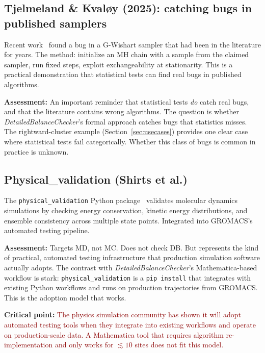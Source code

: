 \documentclass[11pt,a4paper]{article}
\newcommand{\bad}[1]{\textcolor{darkred}{#1}}
\newcommand{\DBC}{\textit{DetailedBalanceChecker}}
\begin{document}
\subsection{Tjelmeland \& Kvaløy (2025): catching bugs in published samplers}

Recent work~\cite{TjelmelandKvaloy2025} found a bug in a G-Wishart sampler that
had been in the literature for years.  The method: initialize an MH chain with
a sample from the claimed sampler, run fixed steps, exploit exchangeability at
stationarity.  This is a practical demonstration that statistical tests can find
real bugs in published algorithms.

\textbf{Assessment:}  An important reminder that statistical tests \emph{do} catch
real bugs, and that the literature contains wrong algorithms.  The question is
whether \DBC{}'s formal approach catches bugs that statistics misses.
The rightward-cluster example (Section~\ref{sec:usecases}) provides one clear
case where statistical tests fail categorically.  Whether this class of bugs is
common in practice is unknown.

\subsection{Physical\_validation (Shirts et al.)}

The \texttt{physical\_validation} Python package~\cite{PhysicalValidation2018}
validates molecular dynamics simulations by checking energy conservation, kinetic
energy distributions, and ensemble consistency across multiple state points.
Integrated into GROMACS's automated testing pipeline.

\textbf{Assessment:}  Targets MD, not MC.  Does not check DB.  But represents the
kind of practical, automated testing infrastructure that production simulation
software actually adopts.  The contrast with \DBC{}'s Mathematica-based workflow
is stark: \texttt{physical\_validation} is a \texttt{pip install} that integrates
with existing Python workflows and runs on production trajectories from GROMACS.
This is the adoption model that works.

\textbf{Critical point:}  \bad{The physics simulation community has shown it will
adopt automated testing tools when they integrate into existing workflows and
operate on production-scale data.  A Mathematica tool that requires algorithm
re-implementation and only works for $\lesssim10$ sites does not fit this model.}

\end{document}

